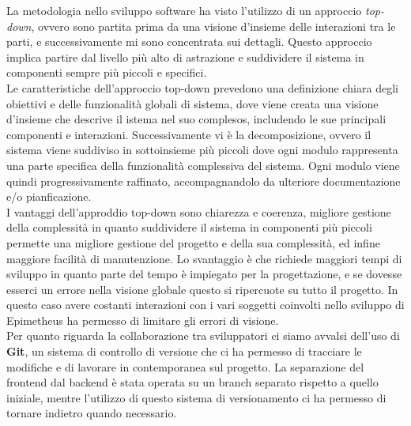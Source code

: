 La metodologia nello sviluppo software ha visto l'utilizzo di un approccio \textit{top-down}, ovvero sono partita prima da una visione d'insieme delle interazioni tra le parti, e successivamente mi sono concentrata sui dettagli. Questo approccio implica partire dal livello più alto di astrazione e suddividere il sistema in componenti sempre più piccoli e specifici. \\
Le caratteristiche dell'approccio top-down prevedono una definizione chiara degli obiettivi e delle funzionalità globali di sistema, dove viene creata una visione d'insieme che descrive il istema nel suo complesos, includendo le sue principali componenti e interazioni. Successivamente vi è la decomposizione, ovvero il sistema viene suddiviso in sottoinsieme più piccoli dove ogni modulo rappresenta una parte specifica della funzionalità complessiva del sistema. Ogni modulo viene quindi progressivamente raffinato, accompagnandolo da ulteriore documentazione e/o pianficazione. \\
I vantaggi dell'approddio top-down sono chiarezza e coerenza, migliore gestione della complessità in quanto suddividere il sistema in componenti più piccoli permette una migliore gestione del progetto e della sua complessità, ed infine maggiore facilità di manutenzione. Lo svantaggio è che richiede maggiori tempi di sviluppo in quanto parte del tempo è impiegato per la progettazione, e se dovesse esserci un errore nella visione globale questo si ripercuote su tutto il progetto. In questo caso avere costanti interazioni con i vari soggetti coinvolti nello sviluppo di Epimetheus ha permesso di limitare gli errori di visione.\\

Per quanto riguarda la collaborazione tra sviluppatori ci siamo avvalsi dell'uso di \textbf{Git}, un sistema di controllo di versione che ci ha permesso di tracciare le modifiche e di lavorare in contemporanea sul progetto. La separazione del frontend dal backend è stata operata su un branch separato rispetto a quello iniziale, mentre l'utilizzo di questo sistema di versionamento ci ha permesso di tornare indietro quando necessario.




